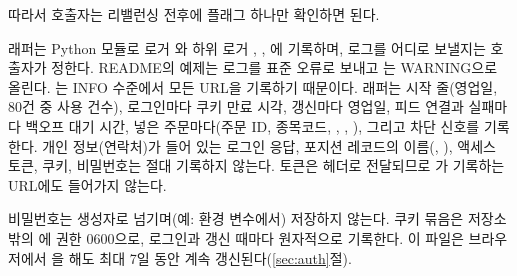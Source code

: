  따라서 호출자는 리밸런싱 전후에 플래그 하나만 확인하면 된다.

 래퍼는 Python  모듈로 로거 와 하위 로거 , , 에 기록하며, 로그를 어디로 보낼지는 호출자가 정한다. README의 예제는 로그를 표준 오류로 보내고 는 WARNING으로 올린다. 는 INFO 수준에서 모든 URL을 기록하기 때문이다. 래퍼는 시작 줄(영업일, 80건 중 사용 건수), 로그인마다 쿠키 만료 시각, 갱신마다 영업일, 피드 연결과 실패마다 백오프 대기 시간, 넣은 주문마다(주문 ID, 종목코드, , , ), 그리고 차단 신호를 기록한다. 개인 정보(연락처)가 들어 있는 로그인 응답, 포지션 레코드의 이름(, ), 액세스 토큰, 쿠키, 비밀번호는 절대 기록하지 않는다. 토큰은 헤더로 전달되므로 가 기록하는 URL에도 들어가지 않는다.

 비밀번호는 생성자로 넘기며(예: 환경 변수에서) 저장하지 않는다. 쿠키 묶음은 저장소 밖의 \allowbreak{}\allowbreak{}에 권한 0600으로, 로그인과 갱신 때마다 원자적으로 기록한다. 이 파일은 브라우저에서 을 해도 최대 7일 동안 계속 갱신된다(\ref{sec:auth}절).


